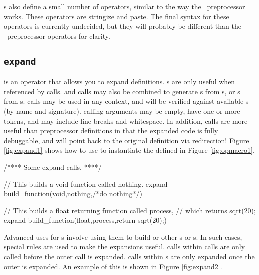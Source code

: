 s also define a small number of operators, similar to the way the \cpp\ preprocessor works.  These operators are stringize and paste.  The final syntax for these operators is currently undecided, but they will probably be different than the \cpp\ preprocessor operators for clarity.

\subsection{{\tt expand}}

 is an operator that allows you to expand  definitions.  s are only useful when referenced by  calls.   and  calls may also be combined to generate s from s, or s from s.   calls may be used in any context, and will be verified against available s (by name and signature).   calling arguments may be empty, have one or more tokens, and may include line breaks and whitespace.  In addition,  calls are more useful than preprocessor definitions in that the expanded code is fully debuggable, and will point back to the original  definition via  redirection!  Figure \ref{fig:expand1} shows how to use  to instantiate the   defined in Figure \ref{fig:opmacro1}.

\begin{opcpp}[label={fig:expand1},caption={Using an \opcppK{expand} call to instantiate the \opcppK{build_function} \opcppK{opmacro} defined in Figure \ref{fig:opmacro1}.}]
/**** Some expand calls. ****/

// This builds a void function called nothing.
expand build_function(void,nothing,/*do nothing*/)

// This builds a float returning function called process, 
// which returns sqrt(20);
expand build_function(float,process,return sqrt(20);)
\end{opcpp}

Advanced uses for s involve using them to build or  other s or s.  In such cases, special rules are used to make the expansions useful.   calls within  calls are only called before the outer call is expanded.   calls within s are only expanded once the outer  is expanded.  An example of this is shown in Figure \ref{fig:expand2}.

